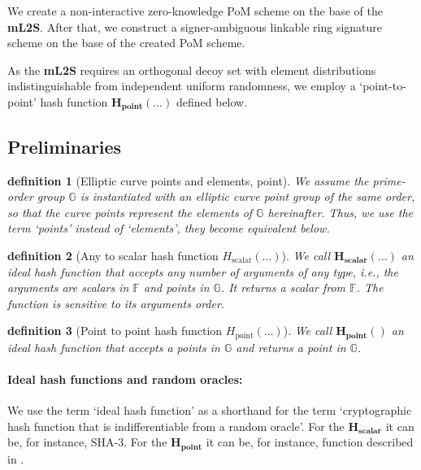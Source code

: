 \documentclass{mathcryptology} %
\newcommand{\Hpoint}{\textbf{H}_{\textbf{point}}}
\newcommand{\Hscalar}{\textbf{H}_{\textbf{scalar}}}
\theoremstyle{title}
\newtheorem*{titledefinition}{definition}
\theoremstyle{titleof}
\begin{document}
    We create a non-interactive zero-knowledge PoM scheme on the base of the \textbf{mL2S}. After that, we construct a signer-ambiguous linkable ring signature scheme on the base of the created PoM scheme. \

    As the \textbf{mL2S} requires an orthogonal decoy set with element distributions indistinguishable from independent uniform randomness, we employ a `point-to-point' hash function $\Hpoint (\dots)$ defined below.


\subsection{Preliminaries}

    \begin{titledefinition}[Elliptic curve points and elements, point]
        We assume the prime-order group $\mathds{G}$ is instantiated with an elliptic curve point group of the same order, so that the curve points represent the elements of $\mathds{G}$ hereinafter. Thus, we use the term `points' instead of `elements', they become equivalent below.
    \end{titledefinition}

    \begin{titledefinition}[Any to scalar hash function $H_{\text{scalar}}(\dots)$]
        We call $\Hscalar(\dots)$ an ideal hash function that accepts any number of arguments of any type, i.e., the arguments are scalars in $\mathds{F}$ and points in $\mathds{G}$. It returns a scalar from $\mathds{F}$. The function is sensitive to its arguments order.
    \end{titledefinition}

    \begin{titledefinition}[Point to point hash function $H_{\text{point}}(\dots)$]
        We call $\Hpoint()$ an ideal hash function that accepts a points in $\mathds{G}$ and returns a point in $\mathds{G}$.
    \end{titledefinition}

\paragraph*{Ideal hash functions and random oracles:}
    We use the term `ideal hash function' as a shorthand for the term `cryptographic hash function that is indifferentiable from a random oracle'. For the $\Hscalar$ it can be, for instance, SHA-3. For the $\Hpoint$ it can be, for instance, function described in \cite{7}.
\end{document}
